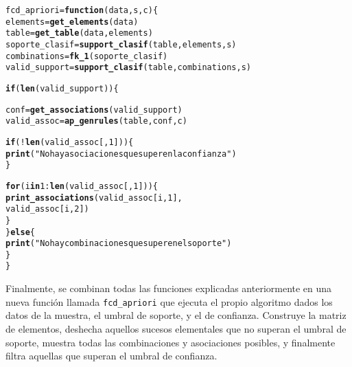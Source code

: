 \documentclass[12pt]{report}\usepackage[]{graphicx}\usepackage[dvipsnames]{xcolor}
\makeatletter
\newcommand{\hlnum}[1]{\textcolor[rgb]{0.686,0.059,0.569}{#1}}%
\newcommand{\hlstr}[1]{\textcolor[rgb]{0.192,0.494,0.8}{#1}}%
\newcommand{\hlopt}[1]{\textcolor[rgb]{0,0,0}{#1}}%
\newcommand{\hlstd}[1]{\textcolor[rgb]{0.345,0.345,0.345}{#1}}%
\newcommand{\hlkwa}[1]{\textcolor[rgb]{0.161,0.373,0.58}{\textbf{#1}}}%
\newcommand{\hlkwb}[1]{\textcolor[rgb]{0.69,0.353,0.396}{#1}}%
\newcommand{\hlkwc}[1]{\textcolor[rgb]{0.333,0.667,0.333}{#1}}%
\newcommand{\hlkwd}[1]{\textcolor[rgb]{0.737,0.353,0.396}{\textbf{#1}}}%
\newenvironment{kframe}{%
 \def\at@end@of@kframe{}%
 \ifinner\ifhmode%
  \def\at@end@of@kframe{\end{minipage}}%
  \begin{minipage}{\columnwidth}%
 \fi\fi%
 \def\FrameCommand##1{\hskip\@totalleftmargin \hskip-\fboxsep
 \colorbox{shadecolor}{##1}\hskip-\fboxsep
     \hskip-\linewidth \hskip-\@totalleftmargin \hskip\columnwidth}%
 \MakeFramed {\advance\hsize-\width
   \@totalleftmargin\z@ \linewidth\hsize
   \@setminipage}}%
 {\par\unskip\endMakeFramed%
 \at@end@of@kframe}
\newenvironment{knitrout}{}{} %
\makeatother
\begin{document}
\begin{knitrout}
\color{fgcolor}\begin{kframe}
\begin{alltt}
\hlstd{fcd_apriori} \hlkwb{=} \hlkwa{function}\hlstd{(}\hlkwc{data}\hlstd{,} \hlkwc{s}\hlstd{,} \hlkwc{c}\hlstd{) \{}
        \hlstd{elements} \hlkwb{=} \hlkwd{get_elements}\hlstd{(data)}
        \hlstd{table} \hlkwb{=} \hlkwd{get_table}\hlstd{(data, elements)}
        \hlstd{soporte_clasif} \hlkwb{=} \hlkwd{support_clasif}\hlstd{(table, elements, s)}
        \hlstd{combinations} \hlkwb{=} \hlkwd{fk_1}\hlstd{(soporte_clasif)}
        \hlstd{valid_support} \hlkwb{=} \hlkwd{support_clasif}\hlstd{(table, combinations, s)}

        \hlkwa{if} \hlstd{(}\hlkwd{len}\hlstd{(valid_support)) \{}

                \hlstd{conf} \hlkwb{=} \hlkwd{get_associations}\hlstd{(valid_support)}
                \hlstd{valid_assoc} \hlkwb{=} \hlkwd{ap_genrules}\hlstd{(table, conf, c)}

                \hlkwa{if} \hlstd{(}\hlopt{!}\hlkwd{len}\hlstd{(valid_assoc[,} \hlnum{1}\hlstd{])) \{}
                        \hlkwd{print}\hlstd{(}\hlstr{"No hay asociaciones que superen la confianza"}\hlstd{)}
                \hlstd{\}}

                \hlkwa{for} \hlstd{(i} \hlkwa{in} \hlnum{1}\hlopt{:}\hlkwd{len}\hlstd{(valid_assoc[,}\hlnum{1}\hlstd{])) \{}
                        \hlkwd{print_associations}\hlstd{(valid_assoc[i,}\hlnum{1}\hlstd{],}
                                \hlstd{valid_assoc[i,}\hlnum{2}\hlstd{])}
                \hlstd{\}}
        \hlstd{\}} \hlkwa{else} \hlstd{\{}
                \hlkwd{print}\hlstd{(}\hlstr{"No hay combinaciones que superen el soporte"}\hlstd{)}
        \hlstd{\}}
\hlstd{\}}
\end{alltt}
\end{kframe}
\end{knitrout}
			
			Finalmente, se combinan todas las funciones explicadas anteriormente en una nueva función llamada \texttt{fcd\_apriori} que ejecuta el propio algoritmo dados los datos de la muestra, el umbral de soporte, y el de confianza. Construye la matriz de elementos, deshecha aquellos sucesos elementales que no superan el umbral de soporte, muestra todas las combinaciones y asociaciones posibles, y finalmente filtra aquellas que superan el umbral de confianza.
			
\end{document}
